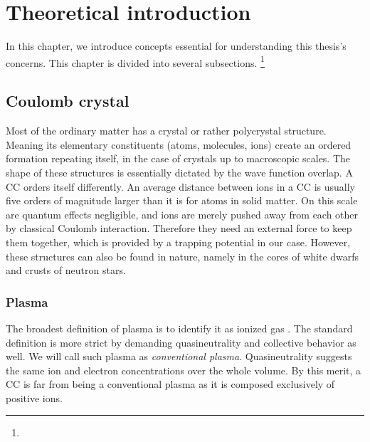 \chapter{Theoretical introduction}
\label{chap:intro}

In this chapter, we introduce concepts essential for understanding this thesis's concerns. This chapter is divided into several subsections. \footnote{} 

\section{Coulomb crystal}
Most of the ordinary matter has a crystal or rather polycrystal structure. Meaning its elementary constituents (atoms, molecules, ions) create an ordered formation repeating itself, in the case of crystals up to macroscopic scales. The shape of these structures \cite{drewsen2003ion} is essentially dictated by the wave function overlap. A CC orders itself differently. An average distance between ions in a CC is usually \cite{thompson2015ion} five orders of magnitude larger than it is for atoms in solid matter. On this scale are quantum effects negligible, and ions are merely pushed away from each other by classical Coulomb interaction. Therefore they need an external force to keep them together, which is provided by a trapping potential in our case. However, these structures can also be found in nature, namely in the cores of white dwarfs and crusts of neutron stars.

\subsection{Plasma}
The broadest definition of plasma is to identify it as ionized gas \cite{fitzpatrick2014plasma}\xxx{\dots}. The standard definition is more strict by demanding quasineutrality and collective behavior as well. We will call such plasma as \emph{conventional plasma}. Quasineutrality suggests the same ion and electron concentrations over the whole volume. By this merit, a CC is far from being a conventional plasma as it is composed exclusively of positive ions.

